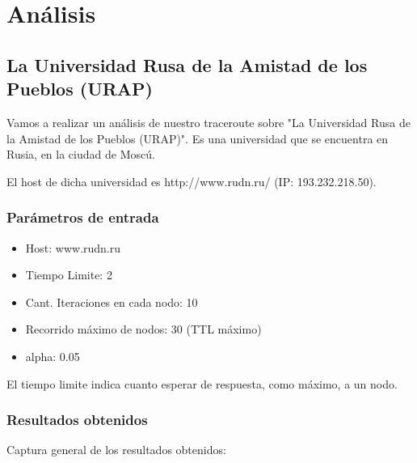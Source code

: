 \section{An\'alisis}

\subsection{La Universidad Rusa de la Amistad de los Pueblos (URAP)}
Vamos a realizar un an\'alisis de nuestro traceroute sobre "La Universidad Rusa de la Amistad de los Pueblos (URAP)". Es una universidad que se encuentra en Rusia, en la ciudad de Mosc\'u.\newline

El host de dicha universidad es http://www.rudn.ru/ (IP: 193.232.218.50).\\	

\subsubsection{Par\'ametros de entrada}
\begin{itemize}
\item Host: www.rudn.ru
\item Tiempo Limite: 2
\item Cant. Iteraciones en cada nodo: 10
\item Recorrido m\'aximo de nodos: 30 (TTL m\'aximo)
\item alpha: 0.05
\end{itemize}
El tiempo limite indica cuanto esperar de respuesta, como m\'aximo, a un nodo.\newline

\subsubsection{Resultados obtenidos}

Captura general de los resultados obtenidos:

